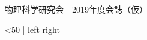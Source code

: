 \documentclass[10pt,b5paper,papersize,dvipdfmx]{jsbook}
\begin{document}
\thispagestyle{empty}

\begin{center}
  {\Large 物理科学研究会　2019年度会誌（仮）}
\end{center}

\newcommand\looploop[2]{
  \setcounter{counter}{0}
  \loop\ifnum\value{counter}<#1
    #2\ignorespaces
  \repeat
}

\looploop{50}{\noindent| left \hfill \the\value{counter} \hfill right |\par}


\cleardoublepage

%
%
\end{document}
